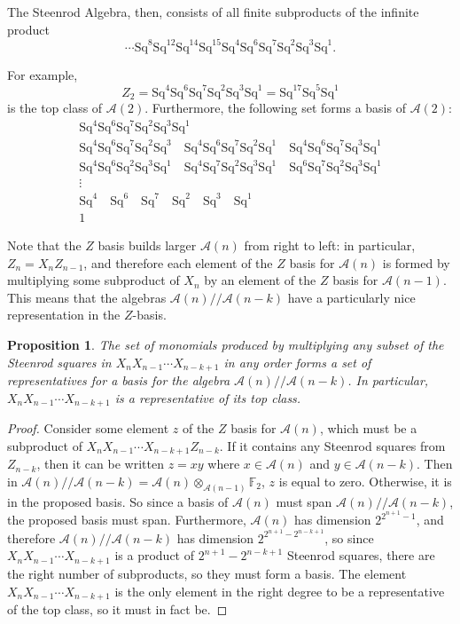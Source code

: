 \documentclass{article}
\newcommand{\A}{\mathcal{A}}
\newcommand{\F}{\mathbb{F}}
\newcommand{\Sq}{\mathrm{Sq}}
\newcommand{\mmod}{/\!/\!}
\newtheorem{prop}{Proposition}
\begin{document}
The Steenrod Algebra, then, consists of all finite subproducts of the infinite product
\[ \cdots\Sq^8\Sq^{12}\Sq^{14}\Sq^{15}\Sq^4\Sq^6\Sq^7\Sq^2\Sq^3\Sq^1.\]

For example,
\[Z_2 = \Sq^4\Sq^6\Sq^7\Sq^2\Sq^3\Sq^1 = \Sq^17 \Sq^5 \Sq^1\]
is the top class of $\A(2)$.  Furthermore, the following set forms a basis of $\A(2)$:
\begin{gather*}
  \Sq^4\Sq^6\Sq^7\Sq^2\Sq^3\Sq^1 \\
  \Sq^4\Sq^6\Sq^7\Sq^2\Sq^3 \quad \Sq^4\Sq^6\Sq^7\Sq^2\Sq^1 \quad \Sq^4\Sq^6\Sq^7\Sq^3\Sq^1 \\
  \Sq^4\Sq^6\Sq^2\Sq^3\Sq^1 \quad \Sq^4\Sq^7\Sq^2\Sq^3\Sq^1 \quad \Sq^6\Sq^7\Sq^2\Sq^3\Sq^1 \\
  \vdots \\
  \Sq^4 \quad \Sq^6 \quad \Sq^7 \quad \Sq^2 \quad \Sq^3 \quad \Sq^1 \\
  1
\end{gather*}

Note that the $Z$ basis builds larger $\A(n)$ from right to left: in particular, $Z_n = X_n Z_{n-1}$, and therefore each element of the $Z$ basis for $\A(n)$ is formed by multiplying some subproduct of $X_n$ by an element of the $Z$ basis for $\A(n-1)$.  This means that the algebras $\A(n)\mmod\A(n-k)$ have a particularly nice representation in the $Z$-basis.

\begin{prop}
  The set of monomials produced by multiplying any subset of the Steenrod squares in $X_n X_{n-1}\cdots X_{n-k+1}$ in any order forms a set of representatives for a basis for the algebra $\A(n)\mmod\A(n-k)$.  In particular, $X_n X_{n-1} \cdots X_{n-k+1}$ is a representative of its top class.
\end{prop}
\begin{proof}
  Consider some element $z$ of the $Z$ basis for $\A(n)$, which must be a subproduct of $X_n X_{n-1}\cdots X_{n-k+1}Z_{n-k}$.  If it contains any Steenrod squares from $Z_{n-k}$, then it can be written $z = xy$ where $x\in \A(n)$ and $y\in \A(n-k)$.  Then in $\A(n)\mmod \A(n-k) = \A(n) \otimes_{\A(n-1)} \F_2$, $z$ is equal to zero.  Otherwise, it is in the proposed basis.  So since a basis of $\A(n)$ must span $\A(n) \mmod \A(n-k)$, the proposed basis must span.  Furthermore, $\A(n)$ has dimension $2^{2^{n+1}-1}$, and therefore $\A(n)\mmod \A(n-k)$ has dimension $2^{2^{n+1}-2^{n-k+1}}$, so since $X_n X_{n-1} \cdots X_{n-k+1}$ is a product of $2^{n+1}-2^{n-k+1}$ Steenrod squares, there are the right number of subproducts, so they must form a basis.  The element $X_n X_{n-1} \cdots X_{n-k+1}$ is the only element in the right degree to be a representative of the top class, so it must in fact be.
\end{proof}
\end{document}
